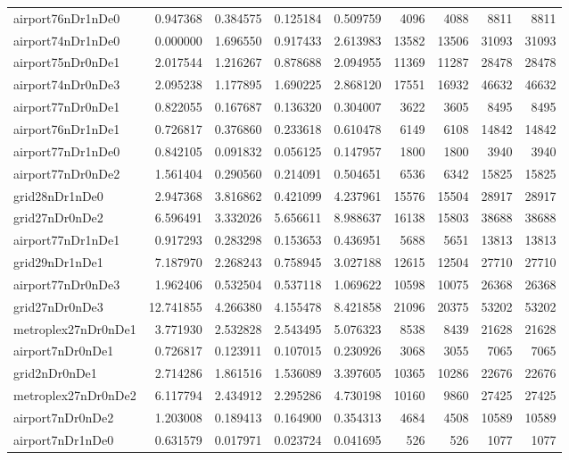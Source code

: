 \begin{longtable}{|l|r|r|r|r|r|r|r|r|}
airport76nDr1nDe0 & 0.947368 & 0.384575 & 0.125184 & 0.509759 & 4096 & 4088 & 8811 & 8811 \\
airport74nDr1nDe0 & 0.000000 & 1.696550 & 0.917433 & 2.613983 & 13582 & 13506 & 31093 & 31093 \\
airport75nDr0nDe1 & 2.017544 & 1.216267 & 0.878688 & 2.094955 & 11369 & 11287 & 28478 & 28478 \\
airport74nDr0nDe3 & 2.095238 & 1.177895 & 1.690225 & 2.868120 & 17551 & 16932 & 46632 & 46632 \\
airport77nDr0nDe1 & 0.822055 & 0.167687 & 0.136320 & 0.304007 & 3622 & 3605 & 8495 & 8495 \\
airport76nDr1nDe1 & 0.726817 & 0.376860 & 0.233618 & 0.610478 & 6149 & 6108 & 14842 & 14842 \\
airport77nDr1nDe0 & 0.842105 & 0.091832 & 0.056125 & 0.147957 & 1800 & 1800 & 3940 & 3940 \\
airport77nDr0nDe2 & 1.561404 & 0.290560 & 0.214091 & 0.504651 & 6536 & 6342 & 15825 & 15825 \\
grid28nDr1nDe0 & 2.947368 & 3.816862 & 0.421099 & 4.237961 & 15576 & 15504 & 28917 & 28917 \\
grid27nDr0nDe2 & 6.596491 & 3.332026 & 5.656611 & 8.988637 & 16138 & 15803 & 38688 & 38688 \\
airport77nDr1nDe1 & 0.917293 & 0.283298 & 0.153653 & 0.436951 & 5688 & 5651 & 13813 & 13813 \\
grid29nDr1nDe1 & 7.187970 & 2.268243 & 0.758945 & 3.027188 & 12615 & 12504 & 27710 & 27710 \\
airport77nDr0nDe3 & 1.962406 & 0.532504 & 0.537118 & 1.069622 & 10598 & 10075 & 26368 & 26368 \\
grid27nDr0nDe3 & 12.741855 & 4.266380 & 4.155478 & 8.421858 & 21096 & 20375 & 53202 & 53202 \\
metroplex27nDr0nDe1 & 3.771930 & 2.532828 & 2.543495 & 5.076323 & 8538 & 8439 & 21628 & 21628 \\
airport7nDr0nDe1 & 0.726817 & 0.123911 & 0.107015 & 0.230926 & 3068 & 3055 & 7065 & 7065 \\
grid2nDr0nDe1 & 2.714286 & 1.861516 & 1.536089 & 3.397605 & 10365 & 10286 & 22676 & 22676 \\
metroplex27nDr0nDe2 & 6.117794 & 2.434912 & 2.295286 & 4.730198 & 10160 & 9860 & 27425 & 27425 \\
airport7nDr0nDe2 & 1.203008 & 0.189413 & 0.164900 & 0.354313 & 4684 & 4508 & 10589 & 10589 \\
airport7nDr1nDe0 & 0.631579 & 0.017971 & 0.023724 & 0.041695 & 526 & 526 & 1077 & 1077 \\

\end{longtable}
